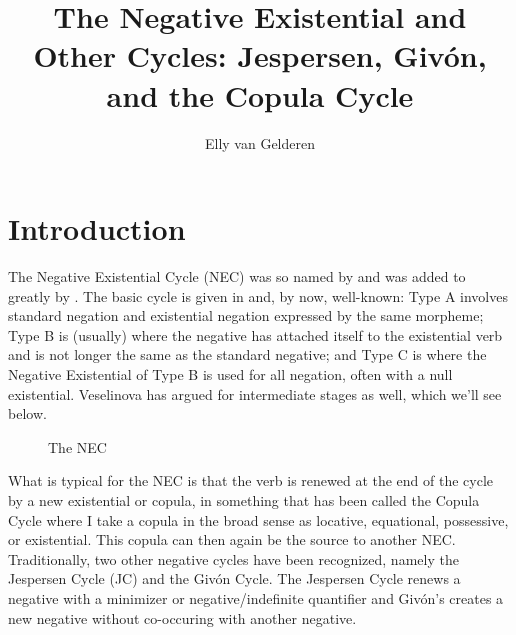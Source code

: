 ﻿\documentclass[output=paper]{langsci/langscibook}
\author{Elly van Gelderen\affiliation{affiliation?}}
\title{The Negative Existential and Other Cycles: Jespersen, Givón, and the Copula Cycle}
\begin{document}
\section{Introduction}

The Negative Existential Cycle (NEC) was so named by
\citet{Croft1991} and was added to greatly by
\textcites(e.g.)(){Veselinova2013}{Veselinova2016}. The basic cycle is
given in  and, by now, well-known: Type A involves
standard negation and existential negation expressed by the same morpheme;
Type B is (usually) where the negative has attached itself to the
existential verb and is not longer the same as the standard negative; and
Type C is where the Negative Existential of Type B is used for all
negation, often with a null existential. Veselinova has argued for
intermediate stages as well, which we'll see below.
%
\begin{figure}
\caption{The NEC \citep{Croft1991}}
\label{fig:other-Croft}
\end{figure}
%
What is typical for the NEC is that the verb is renewed at the end of the
cycle by a new existential or copula, in something that has been called the
Copula Cycle \citep{Katz1996} where I take a copula in the broad sense as
locative, equational, possessive, or existential. This copula can then
again be the source to another NEC. Traditionally, two other negative
cycles have been recognized, namely the Jespersen Cycle (JC) and the Givón
Cycle. The Jespersen Cycle renews a negative with a minimizer or
negative\slash indefinite quantifier and Givón's creates a new negative without
co-occuring with another negative.
\end{document}
